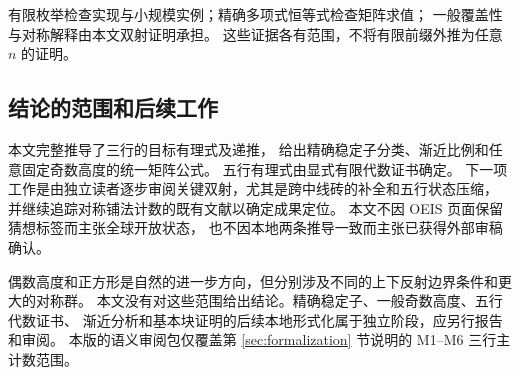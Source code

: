有限枚举检查实现与小规模实例；精确多项式恒等式检查矩阵求值；
一般覆盖性与对称解释由本文双射证明承担。
这些证据各有范围，不将有限前缀外推为任意 $n$ 的证明。

\subsection{结论的范围和后续工作}
本文完整推导了三行的目标有理式及递推，
给出精确稳定子分类、渐近比例和任意固定奇数高度的统一矩阵公式。
五行有理式由显式有限代数证书确定。
下一项工作是由独立读者逐步审阅关键双射，尤其是跨中线砖的补全和五行状态压缩，
并继续追踪对称铺法计数的既有文献以确定成果定位。
本文不因 OEIS 页面保留猜想标签而主张全球开放状态，
也不因本地两条推导一致而主张已获得外部审稿确认。

偶数高度和正方形是自然的进一步方向，但分别涉及不同的上下反射边界条件和更大的对称群。
本文没有对这些范围给出结论。精确稳定子、一般奇数高度、五行代数证书、
渐近分析和基本块证明的后续本地形式化属于独立阶段，应另行报告和审阅。
本版的语义审阅包仅覆盖第 \ref{sec:formalization} 节说明的 M1--M6 三行主计数范围。
